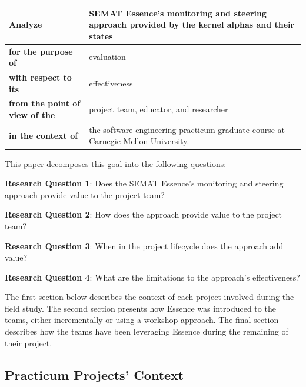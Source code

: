 \begin{table}[h]
\renewcommand{\arraystretch}{1.3}
\centering
\begin{tabular}{|p{1.20in}|p{1.90in}|}
\hline
\textbf{Analyze} & SEMAT Essence's monitoring and steering approach provided by the kernel alphas and their states \\ \hline
\textbf{for the purpose of} & evaluation \\ \hline
\textbf{with respect to its} & effectiveness \\ \hline
\textbf{from the point of view of the} & project team, educator, and researcher \\ \hline
\textbf{in the context of} & the software engineering practicum graduate course at Carnegie Mellon University. \\
\hline
\end{tabular}
\end{table}
 
This paper decomposes this goal into the following questions:

\textbf{Research Question 1}: Does the SEMAT Essence's monitoring and steering approach provide value to the project team?

\textbf{Research Question 2}: How does the approach provide value to the project team?

\textbf{Research Question 3}: When in the project lifecycle does the approach add value?

\textbf{Research Question 4}: What are the limitations to the approach's effectiveness?

The first section below describes the context of each project involved during the field study. The second section presents how Essence was introduced to the teams, either incrementally or using a workshop approach. The final section describes how the teams have been leveraging Essence during the remaining of their project.

\subsection{Practicum Projects' Context}


